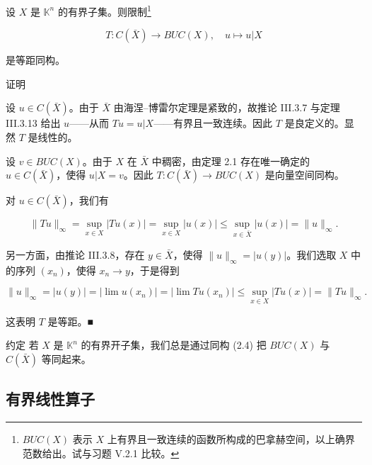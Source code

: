 \begin{application}

设 $ X $ 是 $ \mathbb{K}^n $ 的有界子集。则限制\footnote{$ BUC(X) $ 表示 $ X $ 上有界且一致连续的函数所构成的巴拿赫空间，以上确界范数给出。试与习题 V.2.1 比较。}

\begin{equation}
T : C(\bar{X}) \to BUC(X), \quad u \mapsto u|X\tag{2.4}
\end{equation}

是等距同构。

证明

\begin{subitems}
\item

设 $ u \in C(\bar{X}) $。由于 $ \bar{X} $ 由海涅–博雷尔定理是紧致的，故推论 III.3.7 与定理 III.3.13 给出 $ u $——从而 $ Tu = u|X $——有界且一致连续。因此 $ T $ 是良定义的。显然 $ T $ 是线性的。

\item

设 $ v \in BUC(X) $。由于 $ X $ 在 $ \bar{X} $ 中稠密，由定理 2.1 存在唯一确定的 $ u \in C(\bar{X}) $，使得 $ u|X = v $。因此 $ T : C(\bar{X}) \to BUC(X) $ 是向量空间同构。

\item

对 $ u \in C(\bar{X}) $，我们有

\[
\|Tu\|_\infty = \sup_{x \in X} |Tu(x)| = \sup_{x \in X} |u(x)| \le \sup_{x \in \bar{X}} |u(x)| = \|u\|_\infty.
\]

另一方面，由推论 III.3.8，存在 $ y \in \bar{X} $，使得 $ \|u\|_\infty = |u(y)| $。我们选取 $ X $ 中的序列 $ (x_n) $，使得 $ x_n \to y $，于是得到

\[
\|u\|_\infty = |u(y)| = |\lim u(x_n)| = |\lim Tu(x_n)| \le \sup_{x \in X} |Tu(x)| = \|Tu\|_\infty.
\]

这表明 $ T $ 是等距。\nobreak\hspace{0.35em}■

\end{subitems}

约定 若 $ X $ 是 $ \mathbb{K}^n $ 的有界开子集，我们总是通过同构 (2.4) 把 $ BUC(X) $ 与 $ C(\bar{X}) $ 等同起来。

\end{application}

\subsection*{有界线性算子}

